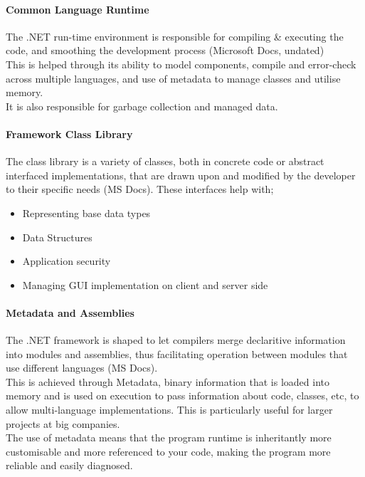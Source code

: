 \documentclass[a4paper, 11pt]{report}
\begin{document}
	\paragraph{Common Language Runtime} The .NET run-time environment is responsible for compiling \& executing the code, and smoothing the development process (Microsoft Docs, undated)
	\\This is helped through its ability to model components, compile and error-check across multiple languages, and use of metadata to manage classes and utilise memory.  
	\\It is also responsible for garbage collection and managed data.
	
	\paragraph{Framework Class Library} The class library is a variety of classes, both in concrete code or abstract interfaced implementations, that are drawn upon and modified by the developer to their specific needs (MS Docs). These interfaces help with; 
	\begin{itemize}
		\item Representing base data types 
		\item Data Structures 
		\item Application security 
		\item Managing GUI implementation on client and server side
	\end{itemize}
	
	\paragraph{Metadata and Assemblies} The .NET framework is shaped to let compilers merge declaritive information into modules and assemblies, thus facilitating operation between modules that use different languages (MS Docs). 
	\\This is achieved through Metadata, binary information that is loaded into memory and is used on execution to pass information about code, classes, etc, to allow multi-language implementations. This is particularly useful for larger projects at big companies. 
	\\The use of metadata means that the program runtime is inheritantly more customisable and more referenced to your code, making the program more reliable and easily diagnosed.
	
	
	
\end{document}
